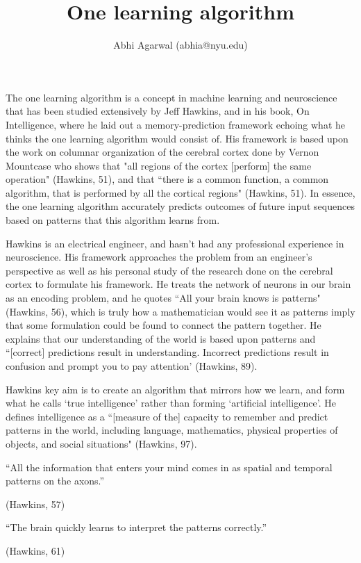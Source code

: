 \documentclass[11pt, oneside]{article}
\title{One learning algorithm}
\author{Abhi Agarwal (abhia@nyu.edu)}
\date{}
\begin{document}
\maketitle

\par The one learning algorithm is a concept in machine learning and neuroscience that has been studied extensively by Jeff Hawkins, and in his book, On Intelligence, where he laid out a memory-prediction framework echoing what he thinks the one learning algorithm would consist of. His framework is based upon the work on columnar organization of the cerebral cortex done by Vernon Mountcase who shows that "all regions of the cortex [perform] the same operation" (Hawkins, 51), and that ``there is a common function, a common algorithm, that is performed by all the cortical regions" (Hawkins, 51). In essence, the one learning algorithm accurately predicts outcomes of future input sequences based on patterns that this algorithm learns from.

\par Hawkins is an electrical engineer, and hasn't had any professional experience in neuroscience. His framework approaches the problem from an engineer's perspective as well as his personal study of the research done on the cerebral cortex to formulate his framework. He treats the network of neurons in our brain as an encoding problem, and he quotes ``All your brain knows is patterns" (Hawkins, 56), which is truly how a mathematician would see it as patterns imply that some formulation could be found to connect the pattern together. He explains that our understanding of the world is based upon patterns and ``[correct] predictions result in understanding. Incorrect predictions result in confusion and prompt you to pay attention' (Hawkins, 89). 

\par Hawkins key aim is to create an algorithm that mirrors how we learn, and form what he calls `true intelligence' rather than forming `artificial intelligence'. He defines intelligence as a ``[measure of the] capacity to remember and predict patterns in the world, including language, mathematics, physical properties of objects, and social situations" (Hawkins, 97).

\epigraph{``All the information that enters your mind comes in as spatial and temporal patterns on the axons.''}{(Hawkins, 57)} 

\epigraph{``The brain quickly learns to interpret the patterns correctly.''}{(Hawkins, 61)} 
\end{document}

